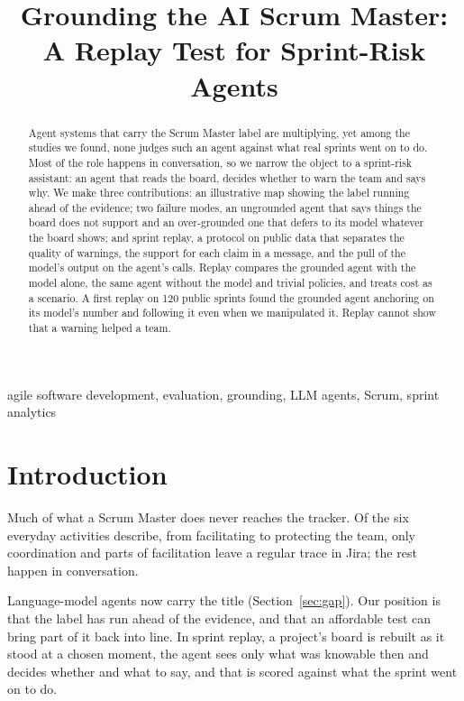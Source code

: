 \documentclass[pmlr]{jmlr}
\title[Grounding the AI Scrum Master]{Grounding the AI Scrum Master: A Replay Test for Sprint-Risk Agents}
\author{\Name{Anonymous Authors}}
\begin{document}
\maketitle

\begin{abstract}
Agent systems that carry the Scrum Master label are multiplying, yet among the studies we found, none judges such an agent against what real sprints went on to do. Most of the role happens in conversation, so we narrow the object to a sprint-risk assistant: an agent that reads the board, decides whether to warn the team and says why. We make three contributions: an illustrative map showing the label running ahead of the evidence; two failure modes, an ungrounded agent that says things the board does not support and an over-grounded one that defers to its model whatever the board shows; and sprint replay, a protocol on public data that separates the quality of warnings, the support for each claim in a message, and the pull of the model's output on the agent's calls. Replay compares the grounded agent with the model alone, the same agent without the model and trivial policies, and treats cost as a scenario. A first replay on 120 public sprints found the grounded agent anchoring on its model's number and following it even when we manipulated it. Replay cannot show that a warning helped a team.
\end{abstract}

\begin{keywords}
agile software development, evaluation, grounding, LLM agents, Scrum, sprint analytics
\end{keywords}

\section{Introduction}

Much of what a Scrum Master does never reaches the tracker. Of the six everyday activities \citet{shastri} describe, from facilitating to protecting the team, only coordination and parts of facilitation leave a regular trace in Jira; the rest happen in conversation.

Language-model agents now carry the title (Section~\ref{sec:gap}). Our position is that the label has run ahead of the evidence, and that an affordable test can bring part of it back into line. In sprint replay, a project's board is rebuilt as it stood at a chosen moment, the agent sees only what was knowable then and decides whether and what to say, and that is scored against what the sprint went on to do.
\end{document}
